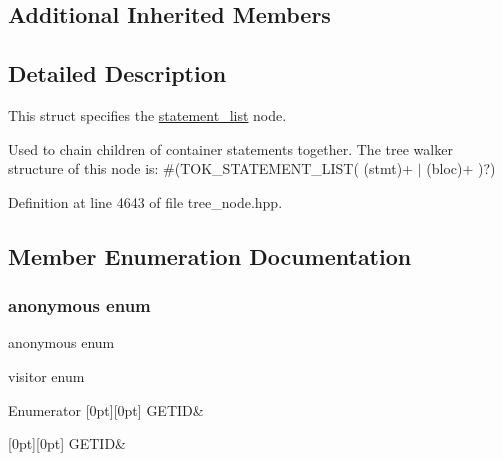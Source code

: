 \subsection*{Additional Inherited Members}


\subsection{Detailed Description}
This struct specifies the \hyperlink{structstatement__list}{statement\+\_\+list} node. 

Used to chain children of container statements together. The tree walker structure of this node is\+: \#(T\+O\+K\+\_\+\+S\+T\+A\+T\+E\+M\+E\+N\+T\+\_\+\+L\+I\+ST( (stmt)+ $\vert$ (bloc)+ )?) 

Definition at line 4643 of file tree\+\_\+node.\+hpp.



\subsection{Member Enumeration Documentation}
\mbox{\label{structstatement__list_a8dc15b7860102231c0bc499608d6331a}} 
\subsubsection{\texorpdfstring{anonymous enum}{anonymous enum}}
{\footnotesize\ttfamily anonymous enum}



visitor enum 

\begin{DoxyEnumFields}{Enumerator}
[0pt][0pt]{}\mbox{\label{structstatement__list_a8dc15b7860102231c0bc499608d6331aa69aba83ab9336aa292e78f4a752677ad}} 
G\+E\+T\+ID&\\
\hline

[0pt][0pt]{}\mbox{\label{structstatement__list_a8dc15b7860102231c0bc499608d6331aa69aba83ab9336aa292e78f4a752677ad}} 
G\+E\+T\+ID&\\
\hline

\end{DoxyEnumFields}


